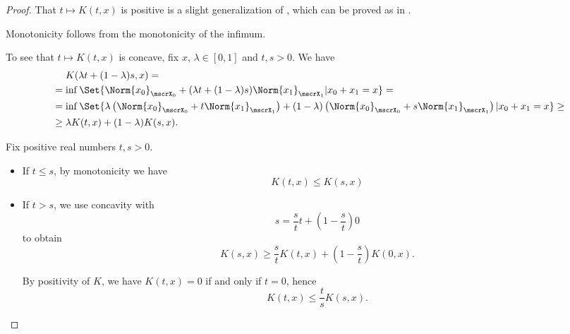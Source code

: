 \begin{proof}
   That \( t \mapsto K(t, x) \) is positive is a slight generalization of , which can be proved as in .

  Monotonicity follows from the monotonicity of the infimum.

  To see that \( t \mapsto K(t, x) \) is concave, fix \( x \), \( \lambda \in [0, 1] \) and \( t, s > 0 \). We have
  \begin{align*}
    &\phantom{{}={}}
    K(\lambda t + (1 - \lambda) s, x)
    = \\ &=
    \inf \Set{ \Norm{x_0}_{\mscrX_0} + (\lambda t + (1 - \lambda) s)\Norm{x_1}_{\mscrX_1} | x_0 + x_1 = x }
    = \\ &=
    \inf \Set{ \lambda \left(\Norm{x_0}_{\mscrX_0} + t \Norm{x_1}_{\mscrX_1} \right) + (1 - \lambda) \left(\Norm{x_0}_{\mscrX_0} + s \Norm{x_1}_{\mscrX_1} \right) | x_0 + x_1 = x }
    \geq \\ &\geq
    \lambda K(t, x) + (1 - \lambda) K(s, x).
  \end{align*}

   Fix positive real numbers \( t, s > 0 \).
  \begin{itemize}
    \item If \( t \leq s \), by monotonicity we have
    \begin{equation}\label{eq:def:k_functional_properties/inequality/monotonicity}
      K(t, x) \leq K(s, x)
    \end{equation}

    \item If \( t > s \), we use concavity with
    \begin{equation*}
      s = \frac s t t + \left(1 - \frac s t \right) 0
    \end{equation*}
    to obtain
    \begin{equation*}
      K(s, x) \geq \frac s t K(t, x) + \left(1 - \frac s t \right) K(0, x).
    \end{equation*}

    By positivity of \( K \), we have \( K(t, x) = 0 \) if and only if \( t = 0 \), hence
    \begin{equation}\label{eq:def:k_functional_properties/inequality/concavity}
      K(t, x) \leq \frac t s K(s, x).
    \end{equation}
  \end{itemize}


\end{proof}
